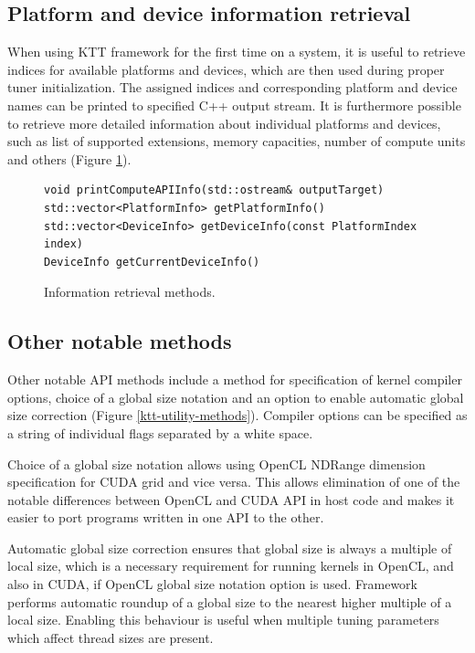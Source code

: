\documentclass
[
    digital, %
    oneside, %
    table, %
    nolof, %
    nolot, %
    nocover %
]{fithesis3}
\begin{document}
\subsection{Platform and device information retrieval}
When using KTT framework for the first time on a system, it is useful to retrieve indices for available platforms and devices, which are then used during
proper tuner initialization. The assigned indices and corresponding platform and device names can be printed to specified C++ output stream. It is
furthermore possible to retrieve more detailed information about individual platforms and devices, such as list of supported extensions, memory
capacities, number of compute units and others (Figure \ref{ktt-information-methods}).

\begin{figure}[ht]
\begin{adjustwidth}{-1cm}{-1cm}
\begin{lstlisting}
void printComputeAPIInfo(std::ostream& outputTarget)
std::vector<PlatformInfo> getPlatformInfo()
std::vector<DeviceInfo> getDeviceInfo(const PlatformIndex index)
DeviceInfo getCurrentDeviceInfo()
\end{lstlisting}
\caption{Information retrieval methods.}
\label{ktt-information-methods}
\end{adjustwidth}
\end{figure}

\subsection{Other notable methods}
Other notable API methods include a method for specification of kernel compiler options, choice of a global size notation and an option to enable
automatic global size correction (Figure \ref{ktt-utility-methods}). Compiler options can be specified as a string of individual flags separated by
a white space.

Choice of a global size notation allows using OpenCL NDRange dimension specification for CUDA grid and vice versa. This allows elimination of one of
the notable differences between OpenCL and CUDA API in host code and makes it easier to port programs written in one API to the other.

Automatic global size correction ensures that global size is always a multiple of local size, which is a necessary requirement for running kernels
in OpenCL, and also in CUDA, if OpenCL global size notation option is used. Framework performs automatic roundup of a global size to the nearest higher
multiple of a local size. Enabling this behaviour is useful when multiple tuning parameters which affect thread sizes are present.
\end{document}
